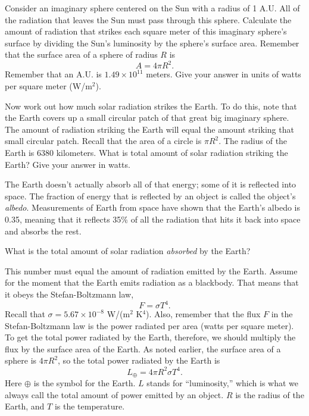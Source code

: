 Consider an imaginary sphere centered on the Sun with a radius
of 1 A.U.  All of the radiation that leaves the Sun must pass through
this sphere.  Calculate the amount of radiation that strikes each square
meter of this imaginary sphere's surface by dividing the Sun's luminosity
by the sphere's surface area.  Remember that the surface area of a sphere
of radius $R$ is
$$
A=4\pi R^2.
$$
Remember that an A.U. is $1.49\times 10^{11}$ meters.
Give your answer in units of watts per square meter (W/m$^2$).

\vskip 1in

Now work out how much solar radiation strikes the Earth.  To do this,
note that the Earth covers up a small circular patch of that great big
imaginary sphere.  The amount of radiation striking the Earth will equal
the amount striking that small circular patch.  Recall that the area
of a circle is $\pi R^2$.  The radius of the Earth is 6380 kilometers.
What is total amount of solar radiation
striking the Earth?  Give your answer in watts.

\vskip 1.5in

The Earth doesn't actually absorb all of that energy; some of it
is reflected into space.  The fraction of energy that is reflected
by an object is called the object's {\it albedo}.  Measurements of Earth
from space have shown that the Earth's albedo is 0.35, meaning that it
reflects 35\% of all the radiation that hits it back into space and absorbs
the rest.  

What is the total amount of solar radiation {\it absorbed} by the Earth?

\vskip 1in

This number must equal the amount of radiation emitted by the Earth.
Assume for the moment that the Earth emits radiation as a blackbody.
That means that it obeys the Stefan-Boltzmann law,
$$
F=\sigma T^4.
$$
Recall that $\sigma=5.67\times 10^{-8}$ W/(m$^2$ K$^4$).
Also, remember that the flux $F$ in the Stefan-Boltzmann law
is the power radiated per area (watts per square meter).  To get
the total power radiated by the Earth, therefore, we should
multiply the flux by the surface area of the Earth.  As noted
earlier, the surface
area of a sphere is $4\pi R^2$, so the total
power radiated by the Earth
is
$$
L_{\oplus}=4\pi R^2\sigma T^4.
$$
Here $\oplus$ is the symbol for the Earth.  $L$ stands
for ``luminosity,'' which is what we always call the total
amount of power emitted by an object.  $R$ is the radius
of the Earth, and $T$ is the temperature.

